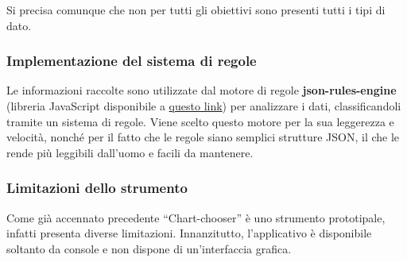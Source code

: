 Si precisa comunque che non per tutti gli obiettivi sono presenti tutti i tipi di dato.


\subsubsection{Implementazione del sistema di regole}\label{subsubsec:rules}
Le informazioni raccolte sono utilizzate dal motore di regole \textbf{json-rules-engine} (libreria JavaScript disponibile a \href{https://github.com/CacheControl/json-rules-engine}{questo link})
per analizzare i dati, classificandoli tramite un sistema di regole. Viene scelto questo motore per la sua leggerezza e velocità, nonché per il fatto che le regole siano semplici strutture JSON, 
il che le rende più leggibili dall'uomo e facili da mantenere.

\subsubsection{Limitazioni dello strumento}
Come già accennato precedente ``Chart-chooser'' è uno strumento prototipale, infatti presenta diverse limitazioni.
Innanzitutto, l'applicativo è disponibile soltanto da console e non dispone di un'interfaccia grafica.
